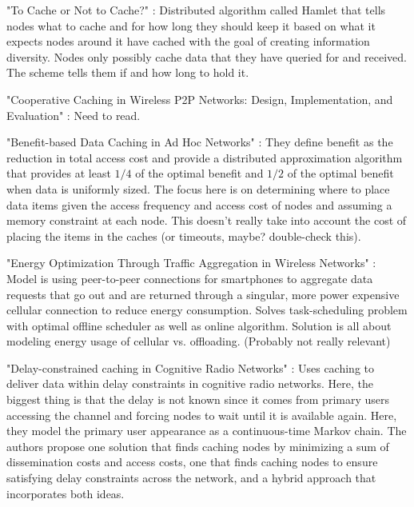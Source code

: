 "To Cache or Not to Cache?" \cite{cache_or_not}:  Distributed algorithm called Hamlet that tells nodes what to cache and for how long they should keep it based on what it expects nodes around it have cached with the goal of creating information diversity.  Nodes only possibly cache data that they have queried for and received.  The scheme tells them if and how long to hold it.  

"Cooperative Caching in Wireless P2P Networks:  Design, Implementation, and Evaluation" \cite{coop_cache_p2p_nets} : Need to read.

"Benefit-based Data Caching in Ad Hoc Networks" \cite{benefit_based_cache}:  They define benefit as the reduction in total access cost and provide a distributed approximation algorithm that provides at least $1/4$ of the optimal benefit and $1/2$ of the optimal benefit when data is uniformly sized.  The focus here is on determining where to place data items given the access frequency and access cost of nodes and assuming a memory constraint at each node.  This doesn't really take into account the cost of placing the items in the caches (or timeouts, maybe?  double-check this).

"Energy Optimization Through Traffic Aggregation in Wireless Networks" \cite{traffic_agg_infocom2014}:  Model is using peer-to-peer connections for smartphones to aggregate data requests that go out and are returned through a singular, more power expensive cellular connection to reduce energy consumption.  Solves task-scheduling problem with optimal offline scheduler as well as online algorithm.  Solution is all about modeling energy usage of cellular vs. offloading.  (Probably not really relevant)

"Delay-constrained caching in Cognitive Radio Networks" \cite{cache_cog_nets_infocom2014}:  Uses caching to deliver data within delay constraints in cognitive radio networks.  Here, the biggest thing is that the delay is not known since it comes from primary users accessing the channel and forcing nodes to wait until it is available again.  Here, they model the primary user appearance as a continuous-time Markov chain.  The authors propose one solution that finds caching nodes by minimizing a sum of dissemination costs and access costs, one that finds caching nodes to ensure satisfying delay constraints across the network, and a hybrid approach that incorporates both ideas.




